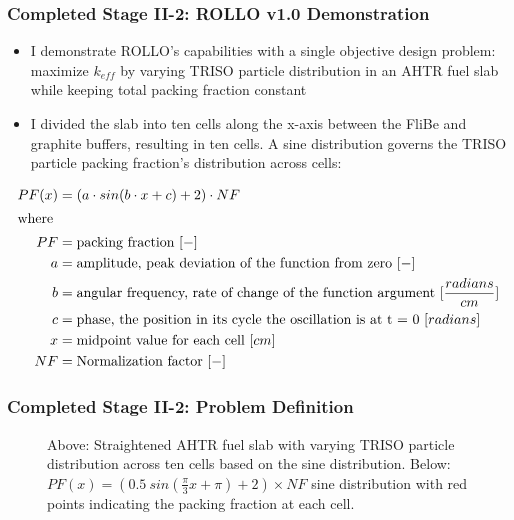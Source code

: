 \begin{frame}
    \frametitle{Completed Stage II-2: ROLLO v1.0 Demonstration}
    \begin{itemize}
        \item I demonstrate ROLLO's capabilities with a single objective design 
        problem: maximize $k_{eff}$ by varying TRISO particle distribution in an 
        AHTR fuel slab while keeping total packing fraction constant
        \item I divided the slab into ten cells along the x-axis between the FliBe and 
        graphite buffers, resulting in ten cells. A sine distribution governs the 
        TRISO particle packing fraction's distribution across cells:
    \end{itemize}
    \small
    \begin{align*}
        PF(x) &= \left(a\cdot sin(b\cdot x + c) + 2\right) \cdot NF\\
        \intertext{where}
        PF &= \mbox{packing fraction } [-] \nonumber \\ 
        a &= \mbox{amplitude, peak deviation of the function from zero } [-] \nonumber \\
        b &= \mbox{angular frequency, rate of change of the function argument } [\frac{radians}{cm}] \nonumber \\
        c &= \mbox{phase, the position in its cycle the oscillation is at t = 0 } [radians]\nonumber \\
        x &= \mbox{midpoint value for each cell } [cm]\nonumber \\
        NF &= \mbox{Normalization factor } [-]\nonumber
    \end{align*}
\end{frame}

\begin{frame}
    \frametitle{Completed Stage II-2: Problem Definition}
    \begin{figure}[]
        \centering
        \caption{Above: Straightened AHTR fuel slab with varying TRISO particle 
        distribution across ten cells based on the sine distribution. 
        Below: $PF(x) = (0.5\ sin(\frac{\pi}{3}x + \pi) + 2)  \times NF$ 
        sine distribution with red points indicating the packing fraction at each cell.}
    \end{figure}
\end{frame}

